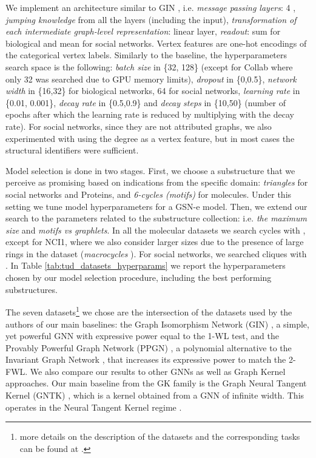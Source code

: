 We implement an architecture similar to GIN \cite{xu2018how}, i.e. \textit{message passing layers}: 4 , \textit{jumping knowledge} from all the layers \cite{DBLP:conf/icml/XuLTSKJ18} (including the input), \textit{transformation of each intermediate graph-level representation}: linear layer, \textit{readout}: sum for biological and mean  for social networks. Vertex features are one-hot encodings of the categorical vertex labels. Similarly to the baseline, the hyperparameters search space is the following: \textit{batch size} in \{32, 128\} (except for Collab where only 32 was searched due to GPU memory limits), \textit{dropout} in \{0,0.5\}, \textit{network width} in \{16,32\} for biological networks, 64 for social networks, \textit{learning rate} in \{0.01, 0.001\}, \textit{decay rate} in \{0.5,0.9\} and \textit{decay steps} in \{10,50\} (number of epochs after which the learning rate is reduced by multiplying with the decay rate). For social networks, since they are not attributed graphs, we also experimented with using the degree as a vertex feature, but in most cases the structural identifiers were sufficient. 


Model selection is done in two stages. First, we choose a substructure that we perceive as promising based on indications from the specific domain: \textit{triangles} for social networks and Proteins, and \textit{6-cycles (motifs)} for molecules. Under this setting we tune model hyperparameters for a GSN-e model. Then, we extend our search to the parameters related to the substructure collection: i.e. \textit{the maximum size } and \textit{motifs vs graphlets}. In all the molecular datasets we search cycles with , except for NCI1, where we also consider larger sizes due to the presence of large rings in the dataset (\textit{macrocycles} \cite{liu2017surveying}).  For social networks, we searched cliques with .  
In Table \ref{tab:tud_datasets_hyperparams} we report the hyperparameters chosen by our model selection procedure, including the best performing substructures.



The seven datasets\footnote{more details on the description of the datasets and the corresponding tasks can be found at \cite{xu2018how}.} we chose are the intersection of the datasets used by the authors of our main baselines: the Graph Isomorphism Network (GIN) \cite{xu2018how}, a simple, yet powerful GNN with expressive power equal to the 1-WL test, and the Provably Powerful Graph Network (PPGN) \cite{maron2019provably}, a polynomial alternative to the Invariant Graph Network \cite{DBLP:conf/iclr/MaronBSL19}, that increases its expressive power to match the 2-FWL.
We also compare our results to other GNNs as well as Graph Kernel approaches. Our main baseline from the GK family is the Graph Neural Tangent Kernel (GNTK) \cite{DBLP:conf/nips/DuHSPWX19}, which is a kernel obtained from a GNN of infinite width. This operates in the Neural Tangent Kernel regime \cite{DBLP:conf/nips/JacotHG18, DBLP:conf/icml/Allen-ZhuLS19, DBLP:conf/icml/DuLL0Z19}.



